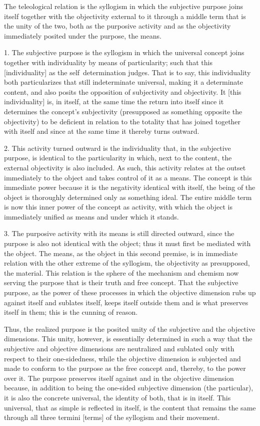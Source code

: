 The teleological relation is the syllogism in which the subjective purpose
joins itself together with the objectivity external to it
through a middle term that is the unity of the two,
both as the purposive activity and as the objectivity
immediately posited under the purpose, the means.

1. The subjective purpose is the syllogism in which the universal concept
joins together with individuality by means of particularity;
such that this [individuality] as the self~determination judges.
That is to say, this individuality both particularizes that still indeterminate universal,
making it a determinate content, and also posits the opposition of subjectivity and objectivity.
It [this individuality] is, in itself, at the same time the return
into itself since it determines the concept's subjectivity
(presupposed as something opposite the objectivity)
to be deficient in relation to the totality that has joined together
with itself and since at the same time it thereby turns outward.

2. This activity turned outward is the individuality that,
in the subjective purpose, is identical to the particularity
in which, next to the content, the external objectivity is also included.
As such, this activity relates at the outset immediately to the object and
takes control of it as a means.
The concept is this immediate power because it is
the negativity identical with itself,
the being of the object is thoroughly determined only as something ideal.
The entire middle term is now this inner power of the concept as activity,
with which the object is immediately unified as means and under which it stands.

3. The purposive activity with its means is still directed outward,
since the purpose is also not identical with the object;
thus it must first be mediated with the object.
The means, as the object in this second premise, is in
immediate relation with the other extreme of the syllogism,
the objectivity as presupposed, the material.
This relation is the sphere of the mechanism and chemism
now serving the purpose that is their truth and free concept.
That the subjective purpose, as the power of these processes in which the
objective dimension rubs up against itself and sublates itself,
keeps itself outside them and is what preserves itself in them;
this is the cunning of reason.

Thus, the realized purpose is the posited unity of
the subjective and the objective dimensions.
This unity, however, is essentially determined in such a way that
the subjective and objective dimensions are neutralized
and sublated only with respect to their one-sidedness,
while the objective dimension is subjected and made to conform
to the purpose as the free concept and, thereby, to the power over it.
The purpose preserves itself against and in the objective dimension
because, in addition to being the one-sided subjective dimension (the particular),
it is also the concrete universal, the identity of both, that is in itself.
This universal, that as simple is reflected in itself, is the content that
remains the same through all three termini [terms] of the syllogism and their movement.

